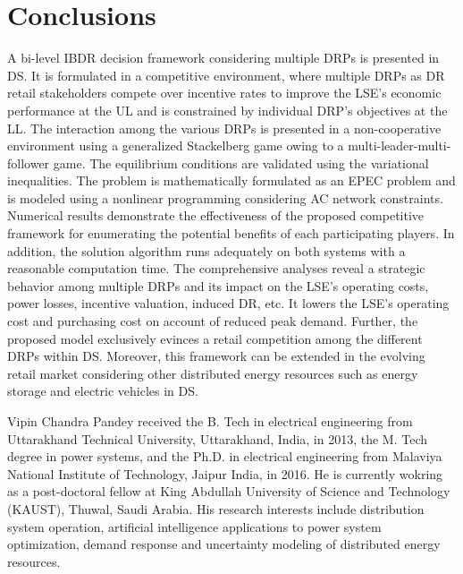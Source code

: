 \documentclass[journal]{IEEEtran}
\begin{document}
\section{Conclusions}
A bi-level IBDR decision framework considering multiple DRPs is presented in DS. It is formulated in a competitive environment, where multiple DRPs as DR retail stakeholders compete over incentive rates to improve the LSE's economic performance at the UL and is constrained by individual DRP's objectives at the LL. The interaction among the various DRPs is presented in a non-cooperative environment using a generalized Stackelberg game owing to a multi-leader-multi-follower game. The equilibrium conditions are validated using the variational inequalities. The problem is mathematically formulated as an EPEC problem and is modeled using a nonlinear programming considering AC network constraints. Numerical results demonstrate the effectiveness of the proposed competitive framework for enumerating the potential benefits of each participating players. In addition, the solution algorithm runs adequately on both systems with a reasonable computation time. The comprehensive analyses reveal a strategic behavior among multiple DRPs and its impact on the LSE's operating costs, power losses, incentive valuation, induced DR, etc. It lowers the LSE's operating cost and purchasing cost on account of reduced peak demand. Further, the proposed model exclusively evinces a retail competition among the different DRPs within DS. Moreover, this framework can be extended in the evolving retail market considering other distributed energy resources such as energy storage  and electric vehicles in DS.



\ifCLASSOPTIONcaptionsoff
  \newpage
\fi


\vspace{-2mm}



\iffalse
\begin{IEEEbiography}[{
	\texttt{[image: \{./GTIBDRPicx/Vipin.jpg]}}}
	]{Vipin Chandra Pandey} received the B. Tech in electrical engineering from Uttarakhand Technical University, Uttarakhand, India, in 2013, the M. Tech degree in power systems, and the Ph.D. in electrical engineering from Malaviya National Institute of Technology, Jaipur India, in 2016. He is currently wokring as a post-doctoral fellow at King Abdullah University of Science and Technology (KAUST), Thuwal, Saudi Arabia. His research interests include distribution system operation, artificial intelligence applications to power system optimization, demand response and uncertainty modeling of distributed energy resources.
\end{IEEEbiography}
\end{document}
